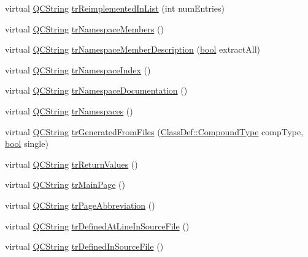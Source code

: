 \begin{DoxyCompactItemize}
virtual \hyperlink{class_q_c_string}{Q\+C\+String} \hyperlink{class_translator_greek_ad886eac93bffb6854142e9af86919563}{tr\+Reimplemented\+In\+List} (int num\+Entries)
\item 
virtual \hyperlink{class_q_c_string}{Q\+C\+String} \hyperlink{class_translator_greek_a8974604fd14909af39fd8269edc90b79}{tr\+Namespace\+Members} ()
\item 
virtual \hyperlink{class_q_c_string}{Q\+C\+String} \hyperlink{class_translator_greek_a1db58f872d81040b982f13486375bab3}{tr\+Namespace\+Member\+Description} (\hyperlink{qglobal_8h_a1062901a7428fdd9c7f180f5e01ea056}{bool} extract\+All)
\item 
virtual \hyperlink{class_q_c_string}{Q\+C\+String} \hyperlink{class_translator_greek_aadd8a53b4412e5d98e3ce677de665815}{tr\+Namespace\+Index} ()
\item 
virtual \hyperlink{class_q_c_string}{Q\+C\+String} \hyperlink{class_translator_greek_a05b26b5fada7f317227a4fd2fcc76b00}{tr\+Namespace\+Documentation} ()
\item 
virtual \hyperlink{class_q_c_string}{Q\+C\+String} \hyperlink{class_translator_greek_a837c963b7763a2bbf4ffdd3c347d01ba}{tr\+Namespaces} ()
\item 
virtual \hyperlink{class_q_c_string}{Q\+C\+String} \hyperlink{class_translator_greek_ae5d424334b6cf190a6558e37b3f64e66}{tr\+Generated\+From\+Files} (\hyperlink{class_class_def_ae70cf86d35fe954a94c566fbcfc87939}{Class\+Def\+::\+Compound\+Type} comp\+Type, \hyperlink{qglobal_8h_a1062901a7428fdd9c7f180f5e01ea056}{bool} single)
\item 
virtual \hyperlink{class_q_c_string}{Q\+C\+String} \hyperlink{class_translator_greek_ad1259d069425e4f8ce5126966b31f447}{tr\+Return\+Values} ()
\item 
virtual \hyperlink{class_q_c_string}{Q\+C\+String} \hyperlink{class_translator_greek_a1a8c7b3c8fb2f74bea7206a45b3dfaae}{tr\+Main\+Page} ()
\item 
virtual \hyperlink{class_q_c_string}{Q\+C\+String} \hyperlink{class_translator_greek_a3b1dea6a2273f2630cf2712af37938a0}{tr\+Page\+Abbreviation} ()
\item 
virtual \hyperlink{class_q_c_string}{Q\+C\+String} \hyperlink{class_translator_greek_a3f6d419d244f211a2eda0bab80adbd9c}{tr\+Defined\+At\+Line\+In\+Source\+File} ()
\item 
virtual \hyperlink{class_q_c_string}{Q\+C\+String} \hyperlink{class_translator_greek_aefabf36bfe9652e31953874e7585f4cf}{tr\+Defined\+In\+Source\+File} ()
\item 

\end{DoxyCompactItemize}
